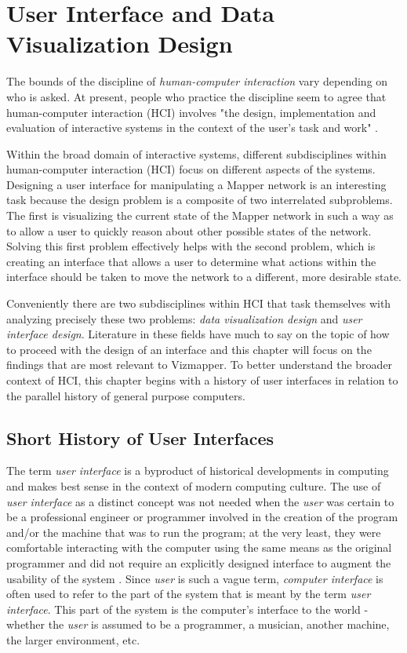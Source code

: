 \resetdatestamp

\chapter{User Interface and Data Visualization Design}

The bounds of the discipline of \emph{human-computer interaction} vary depending on who is asked. At present, people who practice the discipline seem to agree that human-computer interaction (HCI) involves "the design, implementation and evaluation of interactive systems in the context of the user's task and work" \cite{hci1998}. 

Within the broad domain of interactive systems, different subdisciplines within human-computer interaction (HCI) focus on different aspects of the systems. Designing a user interface for manipulating a Mapper network is an interesting task because the design problem is a composite of two interrelated subproblems. The first is visualizing the current state of the Mapper network in such a way as to allow a user to quickly reason about other possible states of the network. Solving this first problem effectively helps with the second problem, which is creating an interface that allows a user to determine what actions within the interface should be taken to move the network to a different, more desirable state. 

Conveniently there are two subdisciplines within HCI that task themselves with analyzing precisely these two problems: \emph{data visualization design} and \emph{user interface design}. Literature in these fields have much to say on the topic of how to proceed with the design of an interface and this chapter will focus on the findings that are most relevant to Vizmapper. To better understand the broader context of HCI, this chapter begins with a history of user interfaces in relation to the parallel history of general purpose computers.

\section{Short History of User Interfaces}

The term \emph{user interface} is a byproduct of historical developments in computing and makes best sense in the context of modern computing culture. The use of \emph{user interface} as a distinct concept was not needed when the \emph{user} was certain to be a professional engineer or programmer involved in the creation of the program and/or the machine that was to run the program; at the very least, they were comfortable interacting with the computer using the same means as the original programmer and did not require an explicitly designed interface to augment the usability of the system \cite{continuity1990}. Since \emph{user} is such a vague term, \emph{computer interface} is often used to refer to the part of the system that is meant by the term \emph{user interface}. This part of the system is the computer's interface to the world - whether the \emph{user} is assumed to be a programmer, a musician, another machine, the larger environment, etc. 

